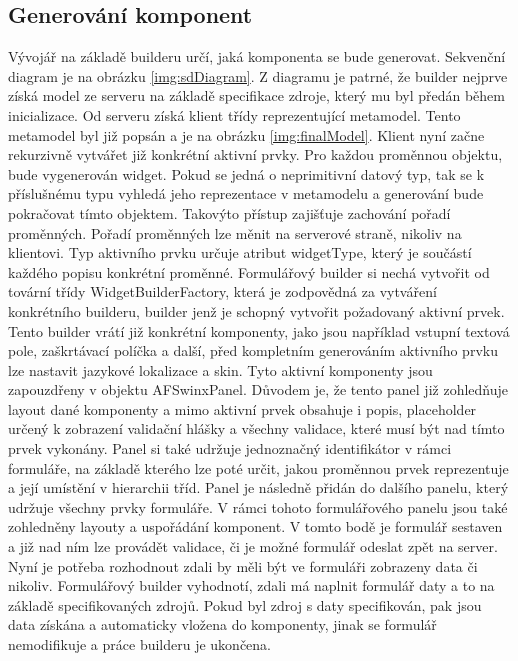 \subsection{Generování komponent}
Vývojář na základě builderu určí, jaká komponenta se bude generovat. Sekvenční diagram je na obrázku \ref{img:sdDiagram}. Z diagramu je patrné, že builder nejprve získá model ze serveru na základě specifikace zdroje, který mu byl předán během inicializace. Od serveru získá klient třídy reprezentující metamodel. Tento metamodel byl již popsán a je na obrázku \ref{img:finalModel}. Klient nyní začne rekurzivně vytvářet již konkrétní aktivní prvky. Pro každou proměnnou objektu, bude vygenerován widget. Pokud se jedná o neprimitivní datový typ, tak se k příslušnému typu vyhledá jeho reprezentace v metamodelu a generování bude pokračovat tímto objektem. Takovýto přístup zajišťuje zachování pořadí proměnných. Pořadí proměnných lze měnit na serverové straně, nikoliv na klientovi. Typ aktivního prvku určuje atribut widgetType, který je součástí každého popisu konkrétní proměnné. Formulářový builder si nechá vytvořit od tovární třídy WidgetBuilderFactory, která je zodpovědná za vytváření konkrétního builderu, builder jenž je schopný vytvořit požadovaný aktivní prvek. Tento builder vrátí již konkrétní komponenty, jako jsou například vstupní textová pole, zaškrtávací políčka a další, před kompletním generováním aktivního prvku lze nastavit jazykové lokalizace a skin. Tyto aktivní komponenty jsou zapouzdřeny v objektu AFSwinxPanel. Důvodem je, že tento panel již zohledňuje layout dané komponenty a mimo aktivní prvek obsahuje i popis, placeholder určený k zobrazení validační hlášky a všechny validace, které musí být nad tímto prvek vykonány. Panel si také udržuje jednoznačný identifikátor v rámci formuláře, na základě kterého lze poté určit, jakou proměnnou prvek reprezentuje a její umístění v hierarchii tříd. Panel je následně přidán do dalšího panelu, který udržuje všechny prvky formuláře. V rámci tohoto formulářového panelu jsou také zohledněny layouty a uspořádání komponent. V tomto bodě je formulář sestaven a již nad ním lze provádět validace, či je možné formulář odeslat zpět na server. Nyní je potřeba rozhodnout zdali by měli být ve formuláři zobrazeny data či nikoliv. Formulářový builder vyhodnotí, zdali má naplnit formulář daty a to na základě specifikovaných zdrojů. Pokud byl zdroj s daty specifikován, pak jsou data získána a automaticky vložena do komponenty, jinak se formulář nemodifikuje a práce builderu je ukončena.

